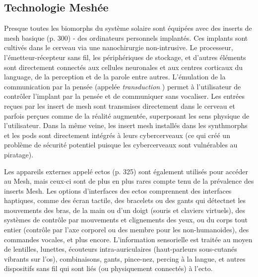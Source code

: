 \subsection{Technologie Meshée} 

Presque toutes les biomorphs du système solaire sont équipées avec des inserts de mesh basique (p. 300) - des ordinateurs personnels implantés. Ces implants sont cultivés dans le cerveau via une nanochirurgie non-intrusive. Le processeur, l'émetteur-récepteur sans fil, les périphériques de stockage, et d'autres éléments sont directement connectés aux cellules neuronales et aux centres corticaux du language, de la perception et de la parole entre autres. L'émulation de la communication par la pensée (appelée \textit{ transduction } ) permet à l'utilisateur de contrôler l'implant par la pensée et de communiquer sans vocaliser. Les entrées reçues par les insert de mesh sont transmises directement dans le cerveau et parfois perçues comme de la réalité augmentée, superposant les sens physique de l'utilisateur. Dans la même veine, les insert mesh installés dans les synthmorphs et les pods sont directement intégrés à leurs cybercerveaux (ce qui créé un problème de sécurité potentiel puisque les cybercerveaux sont vulnérables au piratage). 

Les appareils externes appelé ectos (p. 325) sont également utilisés pour accéder au Mesh, mais ceux-ci sont de plus en plus rares compte tenu de la prévalence des inserts Mesh. Les options d'interfaces des ectos comprennent des interfaces haptiques, comme des écran tactile, des bracelets ou des gants qui détectnet les mouvements des bras, de la main ou d'un doigt (souris et claviers virtuels), des systèmes de contrôle par mouvements et clignements des yeux, ou du corps tout entier (contrôle par l'axe corporel ou des membre pour les non-humanoides), des commandes vocales, et plus encore. L'information sensorielle est traitée au moyen de lentilles, lunettes, écouteurs intra-auriculaires (haut-parleurs sous-cutanés vibrants sur l'os), combinaisons, gants, pince-nez, percing à la langue, et autres dispositifs sans fil qui sont liés (ou physiquement connectés) à l'ecto. 

